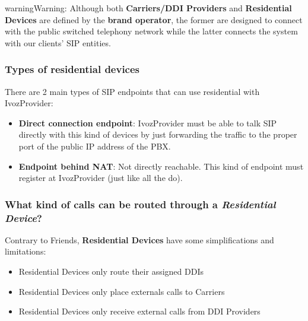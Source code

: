 \documentclass[letterpaper,10pt,english]{sphinxmanual}
\begin{document}
\begin{notice}{warning}{Warning:}
Although both \textbf{Carriers/DDI Providers} and \textbf{Residential Devices} are defined by the
\textbf{brand operator}, the former are designed to connect with the public switched telephony network
while the latter connects the system with our clients' SIP entities.
\end{notice}


\subsubsection{Types of residential devices}
\label{administration_portal/client/residential/residential_devices:types-of-residential-devices}
There are 2 main types of SIP endpoints that can use residential with IvozProvider:
\begin{itemize}
\item {} 
\textbf{Direct connection endpoint}: IvozProvider must be able to talk SIP directly with
this kind of devices by just forwarding the traffic to the proper port of
the public IP address of the PBX.

\item {} 
\textbf{Endpoint behind NAT}: Not directly reachable. This kind of endpoint must register at
IvozProvider (just like all the {\hyperref[administration_portal/client/vpbx/terminals:terminals]{}} do).

\end{itemize}


\subsubsection{What kind of calls can be routed through a \emph{Residential Device}?}
\label{administration_portal/client/residential/residential_devices:what-kind-of-calls-can-be-routed-through-a-residential-device}
Contrary to Friends, \textbf{Residential Devices} have some simplifications and limitations:
\begin{itemize}
\item {} 
Residential Devices only route their assigned DDIs

\item {} 
Residential Devices only place externals calls to Carriers

\item {} 
Residential Devices only receive external calls from DDI Providers

\end{itemize}
\end{document}
